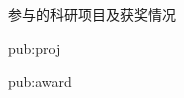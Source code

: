 
\begin{achievements}
  \begin{pubgroup}{参与的科研项目及获奖情况}
    \item{pub:proj}
    \item{pub:award}
  \end{pubgroup}
\end{achievements}

